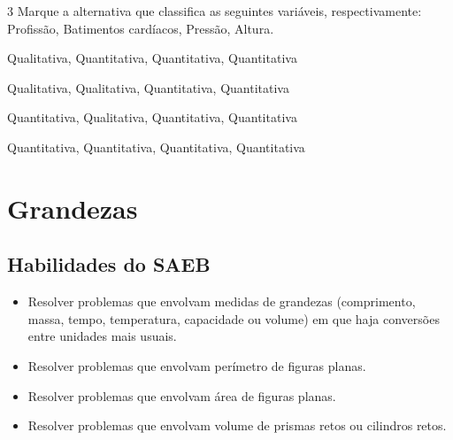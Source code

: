 
\num{3} Marque a alternativa que classifica as seguintes variáveis,
respectivamente: Profissão, Batimentos cardíacos, Pressão, Altura.

\begin{escolha}[itemsep=0pt]
\item Qualitativa, Quantitativa, Quantitativa, Quantitativa
\item Qualitativa, Qualitativa, Quantitativa, Quantitativa
\item Quantitativa, Qualitativa, Quantitativa, Quantitativa
\item Quantitativa, Quantitativa, Quantitativa, Quantitativa
\end{escolha}



\chapter{Grandezas}

\section*{Habilidades do SAEB}
\begin{itemize}
\item
  Resolver problemas que envolvam medidas de grandezas (comprimento,
  massa, tempo, temperatura, capacidade ou volume) em que haja
  conversões entre unidades mais usuais.
\item
  Resolver problemas que envolvam perímetro de figuras planas.
\item
  Resolver problemas que envolvam área de figuras planas.
\item
  Resolver problemas que envolvam volume de prismas retos ou cilindros
  retos.
\end{itemize}

